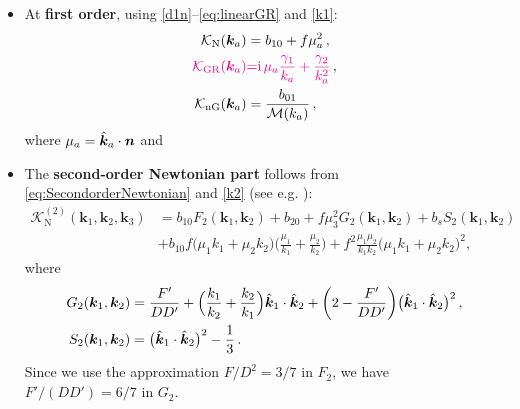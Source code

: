 {{{%
\begin{itemize}
\item
At {\bfseries first order}, using \eqref{d1n}--\eqref{eq:linearGR} and \eqref{k1}:
\begin{align}
\mathcal{K}_{\mathrm{N}}(\bm{k}_{a}) &= b_{10}+f\mu_a^{2}\,,
\label{kn} \\ 
{\color{magenta}{\mathcal{K}_{\mathrm{GR}}(\bm{k}_{a})}} &{\color{magenta}{=}} {\color{magenta}{\mathrm{i}\,\mu_{a} \frac{\gamma_{1}}{k_{a}} + \frac{\gamma_{2}}{k_{a}^{2}}}}\,,  \label{e2.21}\\
\mathcal{K}_{\mathrm{nG}}(\bm{k}_a) &= \frac{b_{01}}{{\cal M}(k_a)}\,, \label{e2.14} 
\end{align}
where   $\mu_a=\hat{\bm {k}}_a\cdot\bm {n}$ and 

\item
The  {\bfseries second-order Newtonian part} follows from \eqref{eq:SecondorderNewtonian}  and \eqref{k2} (see e.g. \cite{Tellarini:2016sgp}): 
\begin{align}
\mathcal{K}^{(2)}_{\mathrm{N}}(\bm{k}_{1}, \bm{k}_{2},\bm{k}_3) &= b_{10}F_{2}(\bm{k}_{1}, \bm{k}_{2}) + b_{20} + f\mu_{3}^{2}G_{2}(\bm{k}_{1}, \bm{k}_{2}) + b_{s}S_{2}(\bm{k}_{1}, \bm{k}_{2}) 
 \label{e2.15}\\ &
+b_{10}{f \big(\mu_1k_1+\mu_2k_2\big)\Big(\frac{\mu_1}{k_1} + \frac{\mu_2}{k_2} \Big)} 
+  f^2 \frac{\mu_1\mu_2}{k_1k_2}\big( \mu_1k_1+\mu_2k_2\big)^2 ,
\nonumber 
\end{align}
where
\begin{align}
G_{2}(\bm{k}_{1},\bm{k}_{2}) &= \frac{F'}{DD'}+ \Big( \frac{k_1}{k_2}+ \frac{k_2}{k_1}\Big)\hat{\bm {k}}_1\cdot \hat{\bm {k}}_2 +\bigg(2 - \frac{F'}{DD'}\bigg)\big( \hat{\bm {k}}_1\cdot \hat{\bm {k}}_2\big)^2\,, \label{g2k}
\\
S_{2}(\bm{k}_{1}, \bm{k}_{2}) &= \big( \hat{\bm {k}}_1\cdot \hat{\bm {k}}_2\big)^2- \frac{1}{3}\,. \label{e2.18}
\end{align}
Since we use the approximation $F/D^2=3/7$ in $F_2$,  we have $F'/(DD')=6/7$ in $G_2$.


\end{itemize}}}}
